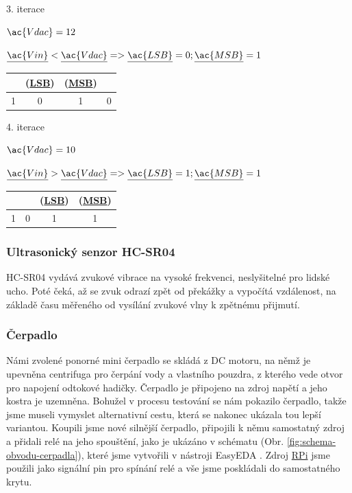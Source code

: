 \documentclass[czech,12pt,a4paper]{article}
\begin{document}
3. iterace

	$\ac{Vdac} = 12$

	$\underline{\ac{Vin}} < \underline{\ac{Vdac}} => \underline{\ac{LSB}} = 0; \underline{\ac{MSB}} = 1$

\begin{center}
	\begin{tabular}{ |c|c|c|c| } 
		\hline
		& (\underline{\ac{LSB}}) & (\underline{\ac{MSB}}) & \\ 
		\hline
		1 & 0 & 1 & 0 \\ 
		\hline
	\end{tabular}
\end{center}

4. iterace

$\ac{Vdac} = 10$

	$\underline{\ac{Vin}} > \underline{\ac{Vdac}} => \underline{\ac{LSB}} = 1; \underline{\ac{MSB}} = 1$

\begin{center}
	\begin{tabular}{ |c|c|c|c| } 
		\hline
		& & (\underline{\ac{LSB}}) & (\underline{\ac{MSB}}) \\ 
		\hline
		1 & 0 & 1 & 1 \\ 
		\hline
	\end{tabular}
\end{center}

\subsubsection{Ultrasonický senzor HC-SR04} \label{secSonic}

\ac{HC-SR04} vydává zvukové vibrace na vysoké frekvenci, neslyšitelné pro lidské ucho. Poté čeká, až se zvuk odrazí zpět od překážky a vypočítá vzdálenost, na základě času měřeného od vysílání zvukové vlny k zpětnému přijmutí.

\subsubsection{Čerpadlo}

Námi zvolené ponorné mini čerpadlo se skládá z DC motoru, na němž je upevněna centrifuga pro čerpání vody a vlastního pouzdra, z kterého vede otvor pro napojení odtokové hadičky. Čerpadlo je připojeno na zdroj napětí a jeho kostra je uzemněna. Bohužel v procesu testování se nám pokazilo čerpadlo, takže jsme museli vymyslet alternativní cestu, která se nakonec ukázala tou lepší variantou. Koupili jsme nové silnější čerpadlo, připojili k němu samostatný zdroj a přidali relé na jeho spouštění, jako je ukázáno v schématu (Obr. \ref{fig:schema-obvodu-cerpadla}), které jsme vytvořili v nástroji EasyEDA \cite{easyeda}. Zdroj \underline{\ac{RPi}} jsme použili jako signální pin pro spínání relé a vše jsme poskládali do samostatného krytu.
\end{document}
